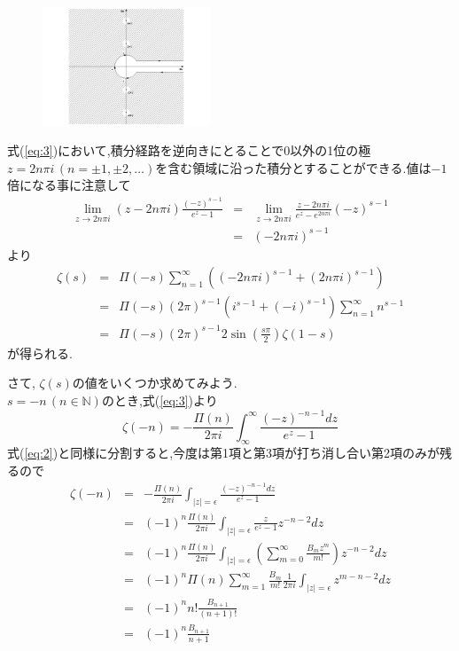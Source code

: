 \begin{figure}
\vspace{-2\baselineskip}
\begin{center}
\includegraphics[width=50mm]{zetamura3.pdf}
\end{center}
\end{figure}
式(\ref{eq:3})において,積分経路を逆向きにとることで0以外の1位の極$z=2n\pi i\,(n=\pm1,\pm2,\ldots)$を含む領域に沿った積分とすることができる.値は$-1$倍になる事に注意して
\begin{eqnarray*}
\lim_{z\to 2n\pi i}(z-2n\pi i)\frac{(-z)^{s-1}}{e^z-1} &=& \lim_{z\to 2n\pi i}\frac{z-2n\pi i}{e^z-e^{2n\pi i}}(-z)^{s-1}\\
&=& (-2n\pi i)^{s-1}
\end{eqnarray*}
より
\begin{eqnarray}
\zeta(s) &=& \Pi(-s)\sum_{n=1}^\infty ((-2n\pi i)^{s-1}+(2n\pi i)^{s-1})\nonumber\\
&=& \Pi(-s)(2\pi)^{s-1}\left(i^{s-1}+(-i)^{s-1}\right)\sum_{n=1}^\infty n^{s-1}\nonumber\\
&=& \Pi(-s)(2\pi)^{s-1}2\sin\left(\frac{s\pi}{2}\right)\zeta(1-s)\label{eq:4}
\end{eqnarray}
が得られる.

さて, $\zeta(s)$の値をいくつか求めてみよう.\\
$s=-n\,(n\in\mathbb{N})$のとき,式(\ref{eq:3})より
\[
\zeta(-n) = -\frac{\Pi(n)}{2\pi i}\int_\infty^\infty \frac{(-z)^{-n-1}dz}{e^z-1}
\]
式(\ref{eq:2})と同様に分割すると,今度は第1項と第3項が打ち消し合い第2項のみが残るので
\begin{eqnarray*}
\zeta(-n) &=& -\frac{\Pi(n)}{2\pi i}\int_{|z|=\epsilon} \frac{(-z)^{-n-1}dz}{e^z-1}\\
&=& (-1)^n\frac{\Pi(n)}{2\pi i}\int_{|z|=\epsilon}\frac{z}{e^z-1}z^{-n-2}dz\\
&=& (-1)^n\frac{\Pi(n)}{2\pi i}\int_{|z|=\epsilon} \left(\sum_{m=0}^\infty \frac{B_m z^m}{m!}\right)z^{-n-2}dz\\
&=& (-1)^n \Pi(n)\sum_{m=1}^\infty \frac{B_m}{m!} \frac{1}{2\pi i}\int_{|z|=\epsilon} z^{m-n-2}dz\\
&=& (-1)^n n!\frac{B_{n+1}}{(n+1)!}\\
&=& (-1)^n \frac{B_{n+1}}{n+1}
\end{eqnarray*}

